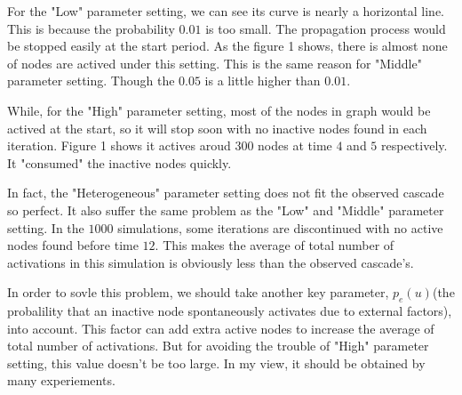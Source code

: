 \documentclass[10pt,a4paper]{article}
\begin{document}
For the "Low" parameter setting, we can see its curve is nearly a horizontal line. This is because the probability \(0.01\) is too small. The propagation process would be stopped easily at the start period. As the figure 1 shows, there is almost none of nodes are actived under this setting. This is the same reason for "Middle" parameter setting. Though the \(0.05\) is a little higher than \(0.01\). 

While, for the "High" parameter setting, most of the nodes in graph would be actived at the start, so it will stop soon with no inactive nodes found in each iteration. Figure 1 shows it actives aroud 300 nodes at time \(4\) and \(5\) respectively. It "consumed" the inactive nodes quickly. 

In fact, the "Heterogeneous" parameter setting does not fit the observed cascade so perfect. It also suffer the same problem as the "Low" and "Middle" parameter setting. In the \(1000\) simulations, some iterations are discontinued with no active nodes found before time \(12\). This makes the average of total number of activations in this simulation is obviously less than the observed cascade's. 

In order to sovle this problem, we should take another key parameter, \(p_{e}(u)\)(the probalility that an inactive node spontaneously activates due to external factors), into account. This factor can add extra active nodes to increase the average of total number of activations. But for avoiding the trouble of "High" parameter setting, this value doesn't be too large. In my view, it should be obtained by many experiements. 

\end{document}
